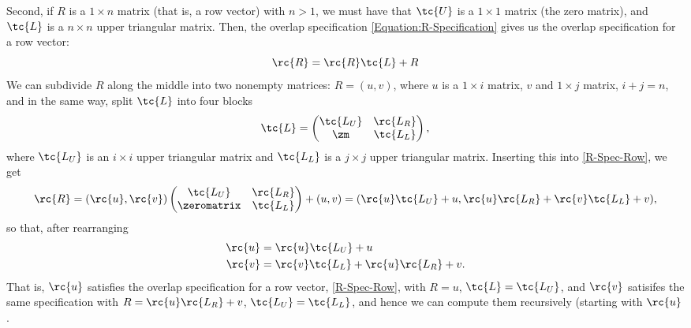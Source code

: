 Second, if $R$ is a $1 \times n$ matrix (that is, a row vector) with $n > 1$, we must have that $\tc{U}$ is a $1 \times 1$ matrix (the zero matrix), and $\tc{L}$ is a $n \times n$ upper triangular matrix. Then, the overlap specification  \eqref{Equation:R-Specification} gives us the overlap specification for a row vector:
\begin{equation}
  \label{R-Spec-Row}
  \rc{R} = \rc{R}\tc{L} + R
\end{equation}
We can subdivide $R$ along the middle into two nonempty matrices: $R = (u , v)$, where $u$ is a $1 \times i$ matrix, $v$ and $1 \times j$ matrix, $i + j = n$, and in the same way, split $\tc{L}$ into four blocks 
\begin{equation*}
  \tc{L} = 
  \begin{pmatrix}
    \tc{L_U} & \rc{L_R} \\
    \zm   & \tc{L_L}
  \end{pmatrix},
\end{equation*}
where $\tc{L_U}$ is an $i \times i$ upper triangular matrix and $\tc{L_L}$ is a $j \times j$ upper triangular matrix. Inserting this into \eqref{R-Spec-Row}, we get
\begin{equation*}
  \rc{R} = (\rc{u} , \rc{v}) 
  \begin{pmatrix}
    \tc{L_U} & \rc{L_R} \\
    \zeromatrix   & \tc{L_L}
  \end{pmatrix}
  + (u , v) 
  = 
  (\rc{u}\tc{L_U} + u , \rc{u}\rc{L_R} + \rc{v}\tc{L_L} + v ),
\end{equation*}
so that, after rearranging
\begin{align*}
  \rc{u} &= \rc{u}\tc{L_U} + u\\
  \rc{v} &= \rc{v}\tc{L_L} + \rc{u}\rc{L_R} + v.
\end{align*}
That is, $\rc{u}$ satisfies the overlap specification for a row vector, \eqref{R-Spec-Row}, with $R = u$, $\tc{L} = \tc{L_U}$, and $\rc{v}$ satisifes the same specification with $R = \rc{u}\rc{L_R} + v$, $\tc{L_U} = \tc{L_L}$, and hence we can compute them recursively (starting with $\rc{u}$. %

